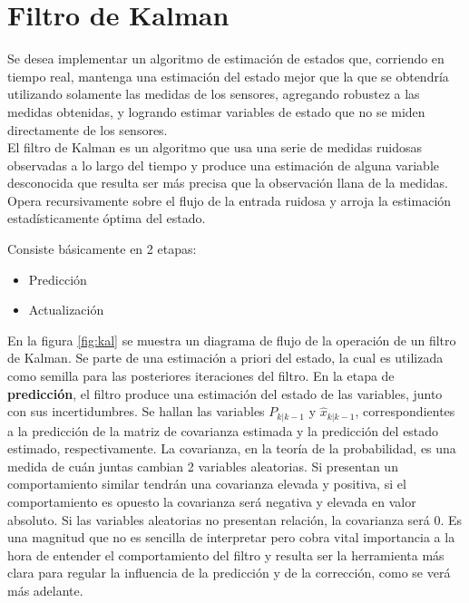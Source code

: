 \documentclass[main]{subfiles}
\begin{document}
\chapter{Filtro de Kalman}
\label{chap:kalman}

Se desea implementar un algoritmo de estimación de estados que, corriendo en tiempo real, mantenga una estimación del estado mejor que la que se obtendría utilizando solamente las medidas de los sensores, agregando robustez a las medidas obtenidas, y logrando estimar variables de estado que no se miden directamente de los sensores.\\

El filtro de Kalman es un algoritmo que usa una serie de medidas ruidosas observadas a lo largo del tiempo y produce una estimación de alguna variable desconocida que resulta ser más precisa que la observación llana de la medidas. Opera recursivamente sobre el flujo de la entrada ruidosa y arroja la estimación estadísticamente óptima del estado.

Consiste básicamente en 2 etapas:
\begin{itemize}
  \item Predicción
  \item Actualización
\end{itemize}

En la figura \ref{fig:kal} se muestra un diagrama de flujo de la operación de un filtro de Kalman. Se parte de una estimación a priori del estado, la cual es utilizada como semilla para las posteriores iteraciones del filtro. En la etapa de \textbf{predicción}, el filtro produce una estimación del estado de las variables, junto con sus incertidumbres. Se hallan las variables $P_{k|k-1}$ y $\hat{x}_{k|k-1}$, correspondientes a la predicción de la matriz de covarianza estimada y la predicción del estado estimado, respectivamente. La covarianza, en la teoría de la probabilidad, es una medida de cuán juntas cambian 2 variables aleatorias. Si presentan un comportamiento similar tendrán una covarianza elevada y positiva, si el comportamiento es opuesto la covarianza será negativa y elevada en valor absoluto. Si las variables aleatorias no presentan relación, la covarianza será 0. Es una magnitud que no es sencilla de interpretar pero cobra vital importancia a la hora de entender el comportamiento del filtro y resulta ser la herramienta más clara para regular la influencia de la predicción y de la corrección, como se verá más adelante.\\
\end{document}
